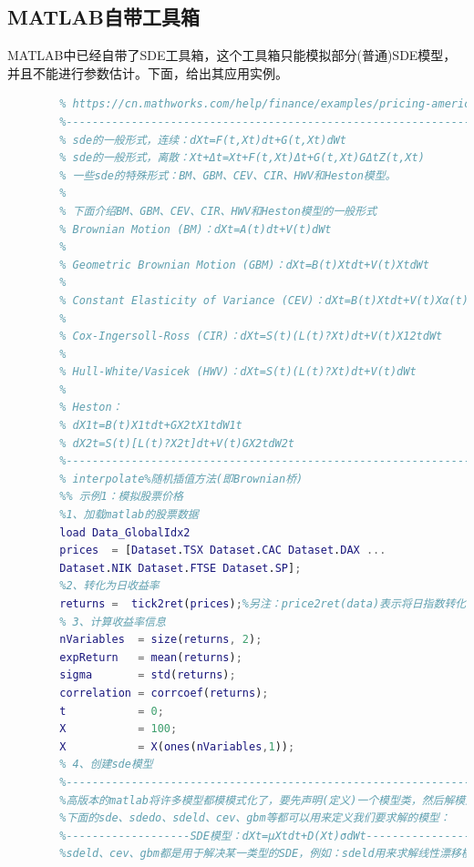     \subsection{MATLAB自带工具箱}
        \par
        MATLAB中已经自带了SDE工具箱，这个工具箱只能模拟部分(普通)SDE模型，并且不能进行参数估计。下面，给出其应用实例。
        \begin{lstlisting}[language= Matlab]
        % 此文件用于matlab自带的SDE工具箱的用法
        % https://cn.mathworks.com/help/finance/examples/pricing-american-basket-options-by-monte-carlo-simulation.html
        %---------------------------------------------------------------%
        % sde的一般形式，连续：dXt=F(t,Xt)dt+G(t,Xt)dWt
        % sde的一般形式，离散：Xt+Δt=Xt+F(t,Xt)Δt+G(t,Xt)GΔtZ(t,Xt)
        % 一些sde的特殊形式：BM、GBM、CEV、CIR、HWV和Heston模型。
        %
        % 下面介绍BM、GBM、CEV、CIR、HWV和Heston模型的一般形式
        % Brownian Motion (BM)：dXt=A(t)dt+V(t)dWt
        %
        % Geometric Brownian Motion (GBM)：dXt=B(t)Xtdt+V(t)XtdWt
        %
        % Constant Elasticity of Variance (CEV)：dXt=B(t)Xtdt+V(t)Xα(t)tdWt
        %
        % Cox-Ingersoll-Ross (CIR)：dXt=S(t)(L(t)?Xt)dt+V(t)X12tdWt
        %
        % Hull-White/Vasicek (HWV)：dXt=S(t)(L(t)?Xt)dt+V(t)dWt
        %
        % Heston：
        % dX1t=B(t)X1tdt+GX2tX1tdW1t
        % dX2t=S(t)[L(t)?X2t]dt+V(t)GX2tdW2t
        %---------------------------------------------------------------%
        % interpolate%随机插值方法(即Brownian桥)
        %% 示例1：模拟股票价格
        %1、加载matlab的股票数据
        load Data_GlobalIdx2
        prices  = [Dataset.TSX Dataset.CAC Dataset.DAX ...
        Dataset.NIK Dataset.FTSE Dataset.SP];
        %2、转化为日收益率
        returns =  tick2ret(prices);%另注：price2ret(data)表示将日指数转化为日收益率%ret2price(data)表示将日收益率转化为日指数:)
        % 3、计算收益率信息
        nVariables  = size(returns, 2);
        expReturn   = mean(returns);
        sigma       = std(returns);
        correlation = corrcoef(returns);
        t           = 0;
        X           = 100;
        X           = X(ones(nVariables,1));
        % 4、创建sde模型
        %---------------------------------------------------------------%
        %高版本的matlab将许多模型都模模式化了，要先声明(定义)一个模型类，然后解模型。
        %下面的sde、sdedo、sdeld、cev、gbm等都可以用来定义我们要求解的模型：
        %-------------------SDE模型：dXt=μXtdt+D(Xt)σdWt----------------%
        %sdeld、cev、gbm都是用于解决某一类型的SDE，例如：sdeld用来求解线性漂移模型(SDE)

\end{lstlisting}
